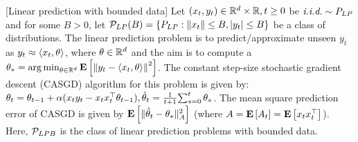 \begin{example}\label{ex:linpred}[Linear prediction with bounded data]
Let $(x_t,y_t)\in \R^{d}\times \R, t\geq 0$ be $\iid \sim P_{LP}$ and for some $B>0$, let $\P_{LP}(B)=\{  P_{LP}: \norm{x_t}\leq B, \md{y_t}\leq B \}$ be a class of distributions. The linear prediction problem is to predict/approximate unseen $y_t$ as $y_t\approx \ip{x_t,\theta}$, where $\theta\in\R^d$ and the aim is to compute a $\ts=\arg\min_{\theta\in\R^d} \EE{\norm{y_t-\ip{x_t,\theta}}^2}$. The constant step-size stochastic gradient descent (CASGD) algorithm for this problem is given by: $
\theta_t=\theta_{t-1}+\alpha(x_t y_t-x_tx_t^\top\theta_{t-1}), \thh_t=\frac{1}{t+1}{\sum}_{s=0}^{t}\,\theta_s$. The mean square prediction error of CASGD is given by $\EE{\normsm{\thh_t-\ts}^2_A}$ (where $A=\EE{A_t}=\EE{x_tx_t^\top}$). Here, $\P_{LPB}$ is the class of linear prediction problems with bounded data.
\end{example}
\begin{comment}
\begin{table}[H]
\resizebox{\columnwidth}{!}{
\begin{tabular}{|c|c|}\hline
TD(0)& GTD\\ \hline
$\begin{aligned}\label{eq:td}
\quad\delta_t &= r_t+(\gamma \phi'_t-\phi_t)^\top \theta_t,\\
\quad\theta_{t+1}&= \theta_t+\alpha \rho_t\phi_t (\delta_t),\\
\quad\thh_{t} &= \frac{1}{t+1}\sum_{s=0}^t \theta_s
\end{aligned}
$ & $\begin{aligned}\label{eq:gtd}
\quad\Delta_t&=\phi_t(\gamma \phi'_t-\phi_t)^\top,\\
y_{t+1}&=y_t+\beta\rho_t(\phi_t r_t+\Delta_t\theta_t -y_t),\\
\theta_{t+1}&=\theta_t+\alpha\Delta_t^\top y_{t+1}\\
\thh_{t}&=\frac{1}{t+1}\sum_{s=0}^t \theta_s, \hat{y}_{t}=\frac{1}{t+1}\sum_{s=0}^t y_s, 
\end{aligned}
$ \\\hline
\end{tabular}
}
\caption{Shows the TD(0) and GTD algorithms. In this paper, we let $\beta=\alpha$ in GTD. It is straightforward to write down appropriate $A_t$ and $b_t$ for the two algorithms, and we leave it as an exercise. 
}
\label{tb:tdalgos}
\end{table}
\end{comment}

